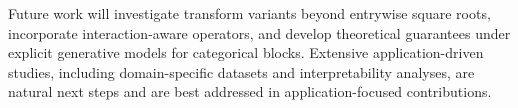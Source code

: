 \documentclass[preprint,11pt]{elsarticle}
\begin{document}
Future work will investigate transform variants beyond entrywise square roots, incorporate interaction-aware operators, and develop theoretical guarantees under explicit generative models for categorical blocks.
Extensive application-driven studies, including domain-specific datasets and interpretability analyses, are natural next steps and are best addressed in application-focused contributions.

\vspace{6pt} 





\end{document}
